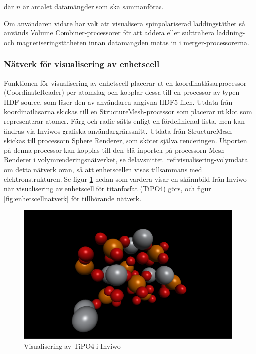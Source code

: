 \documentclass[a4paper,12pt]{article}
\begin{document}
där $n$ är antalet datamängder som ska sammanföras.

Om användaren vidare har valt att visualisera spinpolariserad laddingstäthet så används Volume Combiner-processorer för att addera eller subtrahera laddning- och magnetiseringstätheten innan datamängden matas in i merger-processorerna. 

\subsubsection{Nätverk för visualisering av enhetscell} 
Funktionen för visualisering av enhetscell
placerar ut en koordinatläsarprocessor (CoordinateReader) per atomslag och kopplar dessa till en processor av typen HDF source, som läser den av användaren angivna HDF5-filen. Utdata från koordinatläsarna skickas till en StructureMesh-processor som placerar ut klot som representerar atomer. Färg och radie sätts enligt en fördefinierad lista, men kan ändras via Inviwos grafiska användargränssnitt. Utdata från 
StructureMesh skickas till processorn Sphere Renderer,
som sköter själva renderingen. 
Utporten på denna processor kan kopplas till den blå inporten på processorn Mesh Renderer i 
volymrenderingsnätverket, se delavsnittet \ref{ref:visualisering-volymdata} om detta nätverk ovan, 
så att enhetscellen visas tillsammans 
med elektronstrukturen. Se figur \ref{fig:enhetscell}
nedan som vardera visar en skärmbild från Inviwo när 
visualisering av enhetscell 
för titanfosfat (TiPO4) görs, och figur \ref{fig:enhetscellnatverk} för tillhörande nätverk.

\begin{figure}[H]
    \centering
    \includegraphics[scale=0.25]{screenshot_enhetscell_TiPO4.png}
    \caption{Visualisering av TiPO4 i Inviwo}
    \label{fig:enhetscell}
\end{figure}
\end{document}
